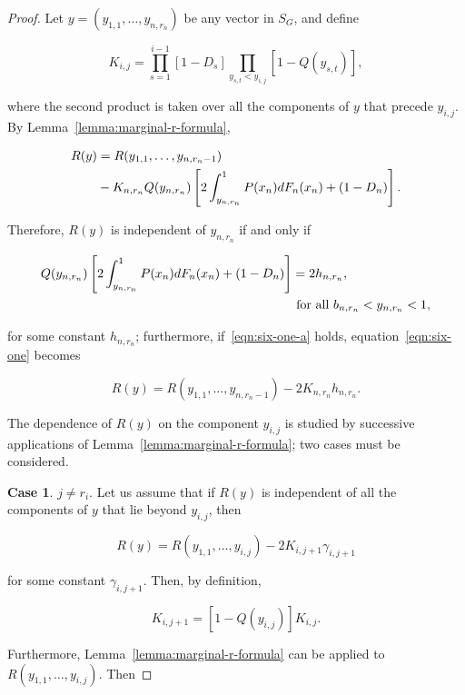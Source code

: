 \documentclass{article}
\begin{document}
\begin{proof}

Let $y = (y_{1, 1}, \dots, y_{n, r_n})$ be any vector in $S_G$, and define

\[
K_{i,j} = \prod_{s=1}^{i-1} [1 - D_s]
          \prod_{y_{s, t} < y_{i, j}} [1 - Q(y_{s, t})],
\]

where the second product is taken over all the components of $y$ that precede
$y_{i, j}$. By Lemma~\ref{lemma:marginal-r-formula},

\begin{align}
R(y) &= R(y_{1, 1}, \dots, y_{n, r_n - 1}) \label{eqn:six-one} \\
 &- K_{n, r_n} Q(y_{n, r_n})
\left [ 2 \int_{y_{n, r_n}}^1 P(x_n) dF_n(x_n) + (1 - D_n) \right ]. \notag
\end{align}

Therefore, $R(y)$ is independent of $y_{n, r_n}$ if and only if

\begin{align}
Q(y_{n, r_n})
\left [ 2 \int_{y_{n, r_n}}^1 P(x_n) dF_n(x_n) + (1 - D_n) \right ] &= 2h_{n,
r_n}, \label{eqn:six-one-a} \\
& \textup{ for all } b_{n, r_n} < y_{n, r_n} < 1, \notag
\end{align}

for some constant $h_{n, r_n}$; furthermore, if~\eqref{eqn:six-one-a} holds,
equation~\eqref{eqn:six-one} becomes

\begin{equation} \label{eqn:six-one-b}
R(y) = R(y_{1, 1}, \dots, y_{n, r_n-1}) - 2K_{n, r_n} h_{n, r_n}.
\end{equation}

The dependence of $R(y)$ on the component $y_{i,j}$ is studied by successive
applications of Lemma~\ref{lemma:marginal-r-formula}; two cases must be
considered.

\textbf{Case 1}. $j \neq r_i$. Let us assume that if $R(y)$ is independent of
all the components of $y$ that lie beyond $y_{i, j}$, then

\begin{equation} \label{eqn:six-second-b}
R(y) = R(y_{1, 1}, \dots, y_{i, j}) - 2K_{i, j+1} \gamma_{i, j+1}
\end{equation}

for some constant $\gamma_{i, j+1}$. Then, by definition,

\[
K_{i, j+1} = [1 - Q(y_{i,j})] K_{i,j}.
\]

Furthermore, Lemma~\ref{lemma:marginal-r-formula} can be applied to $R(y_{1,
1}, \dots, y_{i, j})$. Then


\end{proof}
\end{document}
